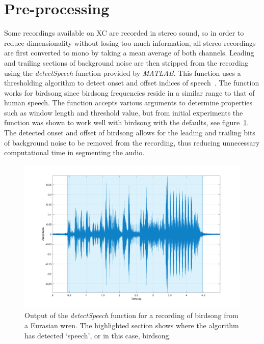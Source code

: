 \section{Pre-processing}

Some recordings available on XC are recorded in stereo sound, so in order to
reduce dimensionality without losing too much information, all stereo recordings
are first converted to mono by taking a mean average of both channels. Leading
and trailing sections of background noise are then stripped from the recording
using the \textit{detectSpeech} function provided by \textit{MATLAB}. This
function uses a thresholding algorithm to detect onset and offset indices of
speech~\cite{giannakopoulos2009method}. The function works for birdsong since
birdsong frequencies reside in a similar range to that of human speech. The
function accepts various arguments to determine properties such as window length
and threshold value, but from initial experiments the function was shown to
work well with birdsong with the defaults, see figure~\ref{fig:detected_speech}.
The detected onset and offset of birdsong allows for the leading and trailing
bits of background noise to be removed from the recording, thus reducing
unnecessary computational time in segmenting the audio.

\begin{figure}[ht]
  \centering
  \includegraphics[width=\textwidth]{figures/detected_speech.png}
  \caption{Output of the \textit{detectSpeech} function for a recording of
  birdsong from a Eurasian wren. The highlighted section shows where the
algorithm has detected `speech', or in this case,
birdsong.}\label{fig:detected_speech}
\end{figure}

